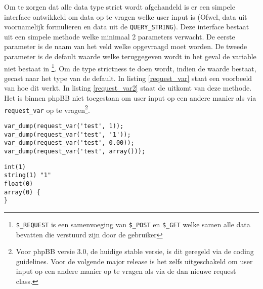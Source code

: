 Om te zorgen dat alle data type strict wordt afgehandeld is er een simpele interface ontwikkeld om data op te vragen welke user input is (Ofwel, data uit voornamelijk formulieren en data uit de \texttt{QUERY\_STRING}). Deze interface bestaat uit een simpele methode welke minimaal 2 parameters verwacht. De eerste parameter is de naam van het veld welke opgevraagd moet worden. De tweede parameter is de default waarde welke teruggegeven wordt in het geval de variable niet bestaat in \footnote{\texttt{\$\_REQUEST} is een samenvoeging van \texttt{\$\_POST} en \texttt{\$\_GET} welke samen alle data bevatten die verstuurd zijn door de gebruiker}. Om de type strictness te doen wordt, indien de waarde bestaat, gecast naar het type van de default. In listing \ref{request_var} staat een voorbeeld van hoe dit werkt. In listing \ref{request_var2} staat de uitkomt van deze methode. Het is binnen phpBB niet toegestaan om user input op een andere manier als via \texttt{request\_var} op te vragen\footnote{Voor phpBB versie 3.0, de huidige stable versie, is dit geregeld via de coding guidelines. Voor de volgende major release is het zelfs uitgeschakeld om user input op een andere manier op te vragen als via de dan nieuwe request class.}.  
\begin{lstlisting}[label=request_var,caption=Voorbeeld van request\_var]
var_dump(request_var('test', 1));
var_dump(request_var('test', '1'));
var_dump(request_var('test', 0.00));
var_dump(request_var('test', array()));
\end{lstlisting}
\begin{lstlisting}[label=request_var2,caption=Uitkomt van request\_var]
int(1)
string(1) "1"
float(0)
array(0) {
}
\end{lstlisting}

